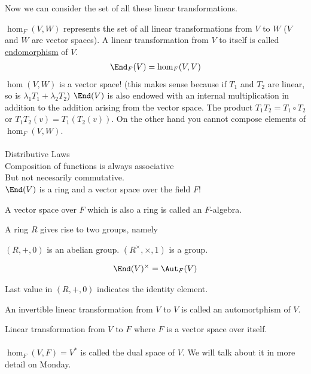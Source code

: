 \documentclass[class=scrartcl, crop=false]{standalone}
\begin{document}
Now we can consider the set of all these linear transformations.

\begin{note}
  \begin{enumerate}
    \ii[]
    \ii
    $\hom_F(V, W)$ represents the set of all linear transformations from $V$ to $W$ ($V$ and $W$ are vector spaces). %
    \ii
    A linear transformation from $V$ to itself is called \ul{endomorphism} of $V$. 
    \begin{gather*}
      \End_F(V) = \hom_F(V, V)
    \end{gather*} 
    \ii
    $\hom(V, W)$ is a vector space! (this makes sense because if $T_1$ and $T_2$ are linear, so is $\lambda_1T_1 + \lambda_2T_2$)
    \ii
    $\End(V)$ is also endowed with an internal multiplication in addition to the addition arising from the vector space. The product $T_1T_2 = T_1 \circ T_2$ or $T_1T_2(v) = T_1(T_2(v))$. On the other hand you cannot compose elements of $\hom_F(V, W)$. 
    \\\\
    Distributive Laws %
    \\
    Composition of functions is always associative %
    \\
    But not necesarily commutative.
    \\
    $\End(V)$ is a ring and a vector space over the field $F$!
    \begin{definition}
      A vector space over $F$ which is also a ring is called an $F$-algebra.
    \end{definition} 
  \end{enumerate} 
\end{note} 

A ring $R$ gives rise to two groups, namely 
\begin{enumerate}
  \ii
  $(R, +, 0)$ is an abelian group.
  \ii
  $(R^{\times}, \times, 1)$ is a group.
\end{enumerate} 

\begin{gather*}
  \End(V)^{\times} = \Aut_F(V)
\end{gather*} 

\begin{note}
  Last value in $(R, +, 0)$ indicates the identity element.
\end{note} 


\begin{definition}[Automorphism]
  An invertible linear transformation from $V$ to $V$ is called an automortphism of $V$.
\end{definition} 


\begin{definition}
  Linear transformation from $V$ to $F$ where $F$ is a vector space over itself.
  \\\\
  $\hom_F(V, F) = V^*$ is called the dual space of $V$. We will talk about it in more detail on Monday.
\end{definition} 
\end{document}
